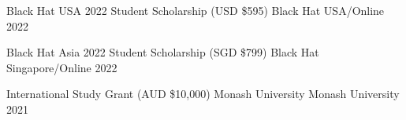 


\begin{cvhonors}

    \cvhonor
    {Black Hat USA 2022 Student Scholarship (USD \$595)}
    {Black Hat}
    {USA/Online}
    {2022}


    
  \cvhonor
      {Black Hat Asia 2022 Student Scholarship (SGD \$799)}
      {Black Hat}
      {Singapore/Online}
      {2022}

  \cvhonor
    {International Study Grant (AUD \$10,000)} %
    {Monash University} %
    {Monash University} %
    {2021} %

\end{cvhonors}

